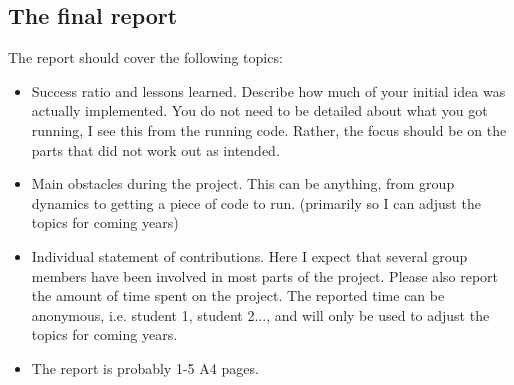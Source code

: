 \documentclass[fleqn, article, a4paper]{memoir}
\begin{document}
\subsection*{The final report}
\noindent The report should cover the following topics:
\begin{itemize}
\item Success ratio and lessons learned. Describe how much of your initial idea was actually implemented. You do not need to be detailed about what you got running, I see this from the running code. Rather, the focus should be on the parts that did not work out as intended.
\item Main obstacles during the project. This can be anything, from group dynamics to getting a piece of code to run. (primarily so I can adjust the topics for coming years)
\item Individual statement of contributions. Here I expect that several group members have been involved in most parts of the project. Please also report the amount of time spent on the project. The reported time can be anonymous, i.e. student 1, student 2..., and will only be used to adjust the topics for coming years.
\item The report is probably 1-5 A4 pages.
\end{itemize}

\end{document}
